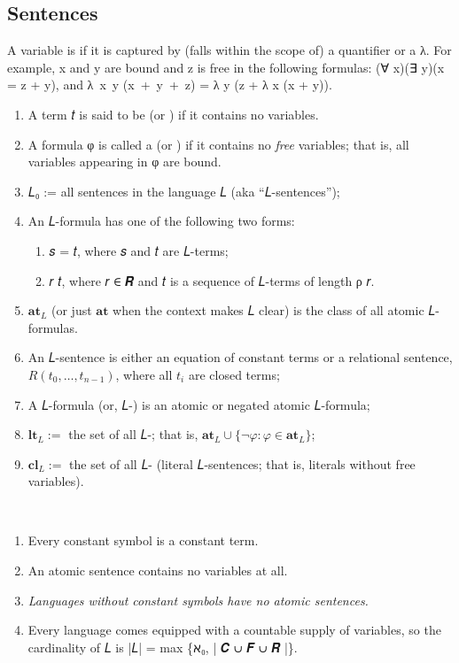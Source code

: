 \documentclass[a4paper,UKenglish,cleveref,autoref,thm-restate,12pt]{lipics-v2021-wjd}
\newcommand{\<}{\langle}
\renewcommand{\>}{\rangle}
\begin{document}
\subsection{Sentences}\label{sentences}
A variable is  if it is captured by (falls within the scope of) a
quantifier or a λ. For example, x and y are bound and z is free in the following
formulas: (∀ x)(∃ y)(x = z + y), and λ~x~y (x~+~y~+~z) = λ y (z + λ x (x + y)).
\begin{enumerate}
\item
  A term 𝑡 is said to be  (or ) if
  it contains no variables.
\item
  A formula φ is called a  (or ) if it contains no \emph{free} variables; that is,
  all variables appearing in φ are bound.
\item
  𝐿₀ := all sentences in the language 𝐿 (aka ``𝐿-sentences'');
\item
  An  𝐿-formula has one of the following two forms:
  \begin{enumerate} 
  \item 𝑠 = 𝑡, where 𝑠 and 𝑡 are 𝐿-terms;
  \item 𝑟 𝑡, where 𝑟 ∈ 𝑹 and 𝑡 is a sequence of 𝐿-terms of length ρ 𝑟.
  \end{enumerate}
\item
  \(\mathbf{at}_L\) (or just \(\mathbf{at}\) when the context makes
  𝐿 clear) is the class of all atomic 𝐿-formulas.
\item
  An  𝐿-sentence is either an equation of constant
  terms or a relational sentence, \(R(t_0, \dots, t_{n-1})\), where all
  \(t_i\) are closed terms;
\item
  A  𝐿-formula (or, 𝐿-) is an
  atomic or negated atomic 𝐿-formula;
\item
  \(\mathbf{lt}_L:=\) the set of all 𝐿-; that is,
  \(\mathbf{at}_L \cup \{¬ φ : φ \in \mathbf{at}_L\}\);
\item
  \(\mathbf{cl}_L:=\) the set of all 
  𝐿- (literal 𝐿-sentences; that is, literals
  without free variables).
\end{enumerate}
\begin{remarks*}\
\begin{enumerate}
\item Every constant symbol is a constant term.
\item An atomic sentence contains no variables at all.
\item \emph{Languages without constant symbols have no atomic sentences.}
\item Every language comes equipped with a countable supply of variables, so the
      cardinality of 𝐿 is |𝐿| = max \{ℵ₀, | 𝑪 ∪ 𝑭 ∪ 𝑹 |\}.
\end{enumerate}
\end{remarks*}
\end{document}
